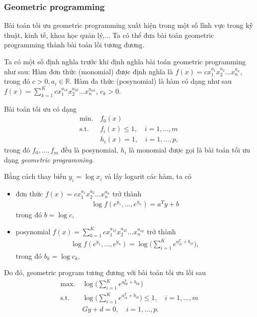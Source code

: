 \documentclass{book}
\begin{document}
\subsubsection*{Geometric programming}
Bài toán tối ưu geometric programming xuất hiện trong một số lĩnh vực trong kỹ thuật, kinh tế, khoa học quản lý,... Ta có thể đưa bài toán geometric programming thành bài toán lồi tương đương.

Ta  có một số định nghĩa trước khi định nghĩa bài toán geometric programming như sau:
Hàm đơn thức (monomial) được định nghĩa là $f(x) = c x_1^{a_1} x_2^{a_2} \ldots x_n^{a_n}$, trong đó $c > 0, a_i \in \mathbb{R}$.
Hàm đa thức (posynomial) là hàm có dạng như sau $f(x) = \sum_{k = 1}^K c x_1^{a_{1k}} x_2^{a_{2k}} \ldots x_n^{a_{nk}}$, $c_k > 0$.

Bài toán tối ưu có dạng 
\begin{align*}
\mathrm{min.}~ & f_0(x)\\
\mathrm{s.t.}~ & f_i(x) \leq 1, \quad i = 1, \ldots, m \\
			& h_i(x) = 1, 	\quad i = 1, \ldots, p,
\end{align*}
trong đó $f_0, \ldots, f_m$ đều là posynomial, $h_i$ là monomial được gọi là bài toán tối ưu dạng \emph{geometric programming}.

Bằng cách thay biến $y_i = \log x_i$ và lấy logarit các hàm, ta có
\begin{itemize}
\item đơn thức $f(x) = c x_1^{a_1} x_2^{a_2} \ldots x_n^{a_n}$ trở thành
\begin{align*}
\log f(e^{y_1}, \ldots, e^{y_n})= a^T y + b
\end{align*}
trong đó $b = \log c$,
\item posynomial  $f(x) = \sum_{k = 1}^K c x_1^{a_{1k}} x_2^{a_{2k}} \ldots x_n^{a_{nk}}$ trở thành
\begin{align*}
\log f(e^{y_1}, \ldots, e^{y_n})= \log\Big(\sum_{i=1}^K e^{a_{ik}^T + b_{ik}}\Big),
\end{align*}
trong đó $b_k = \log c_k$,
\end{itemize}

Do đó, geometric program tương đương với bài toán tối ưu lồi sau
\begin{align*}
\mathrm{max.}~ & \log\Big(\sum_{i=1}^K e^{a_{0k}^T + b_{0k}}\Big)\\
\mathrm{s.t.}~ & \log\Big(\sum_{i=1}^K e^{a_{ik}^T + b_{ik}}\Big) \leq 1, \quad i = 1, \ldots, m \\
			& Gy + d = 0, 	\quad i = 1, \ldots, p.
\end{align*}
\end{document}
